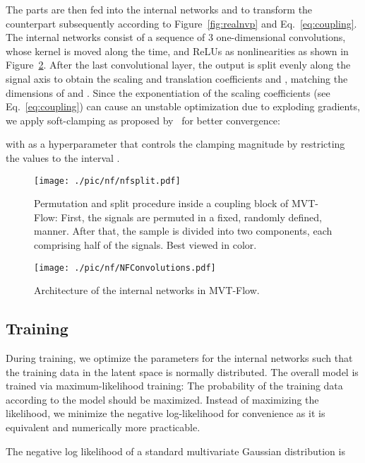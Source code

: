 \documentclass[journal]{IEEEtran}
\begin{document}
The parts are then fed into the internal networks  and  to transform the counterpart subsequently according to Figure~\ref{fig:realnvp} and Eq.~\ref{eq:coupling}.
The internal networks consist of a sequence of 3 one-dimensional convolutions, whose kernel is moved along the time, and ReLUs as nonlinearities as shown in Figure~\ref{fig:internal}.
After the last convolutional layer, the output is split evenly along the signal axis to obtain the scaling and translation coefficients  and , {matching the dimensions  of  and .}
Since the exponentiation of the scaling coefficients (see Eq.~\ref{eq:coupling}) can cause an unstable optimization due to exploding gradients, we apply soft-clamping as proposed by~\cite{cinn} for better convergence:

with  as a hyperparameter that controls the clamping magnitude by restricting the values to the interval .

\begin{figure}[]
    \centering
    \texttt{[image: ./pic/nf/nfsplit.pdf]}
    \caption{Permutation and split procedure inside a coupling block of MVT-Flow: First, the signals are permuted in a fixed, randomly defined, manner. After that, the sample is divided into two components, each comprising half of the signals. Best viewed in color.}
    \label{fig:nf_split}
    \vspace{-2mm}
\end{figure}

\begin{figure}[]
    \centering
    \texttt{[image: ./pic/nf/NFConvolutions.pdf]}
    \caption{Architecture of the internal networks in MVT-Flow.}
    \label{fig:internal}
    \vspace{-2mm}
\end{figure}

\subsection{Training}
\label{training}
During training, we optimize the parameters for the internal networks such that the training data in the latent space is normally distributed.
The overall model is trained via maximum-likelihood training:
The probability of the training data according to the model should be maximized.
Instead of maximizing the likelihood, we minimize the negative log-likelihood  for convenience as it is equivalent and numerically more practicable.

The negative log likelihood of a standard multivariate Gaussian distribution is
\end{document}
